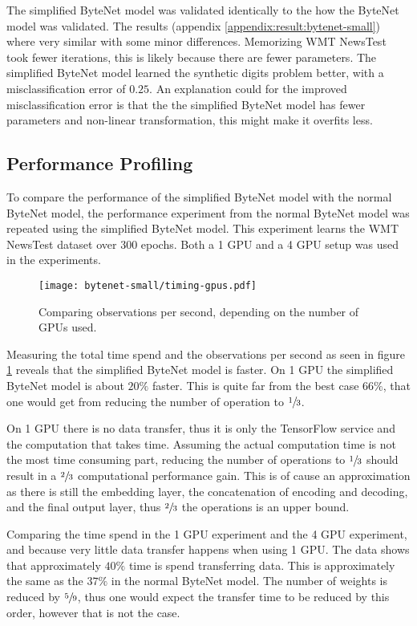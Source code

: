 The simplified ByteNet model was validated identically to the how the ByteNet model was validated. The results (appendix \ref{appendix:result:bytenet-small}) where very similar with some minor differences. Memorizing WMT NewsTest took fewer iterations, this is likely because there are fewer parameters. The simplified ByteNet model learned the synthetic digits problem better, with a misclassification error of $0.25$. An explanation could for the improved misclassification error is that the the simplified ByteNet model has fewer parameters and non-linear transformation, this might make it overfits less.

\subsection{Performance Profiling}

To compare the performance of the simplified ByteNet model with the normal ByteNet model, the performance experiment from the normal ByteNet model was repeated using the simplified ByteNet model. This experiment learns the WMT NewsTest dataset over 300 epochs. Both a 1 GPU and a 4 GPU setup was used in the experiments.

\begin{figure}[h]
    \centering
    \texttt{[image: bytenet-small/timing-gpus.pdf]}
    \caption{Comparing observations per second, depending on the number of GPUs used.}
    \label{fig:result:simple-bytenet:timing-gpus}
\end{figure}

Measuring the total time spend and the observations per second as seen in figure \ref{fig:result:simple-bytenet:timing-gpus} reveals that the simplified ByteNet model is faster. On 1 GPU the simplified ByteNet model is about $20\%$ faster. This is quite far from the best case $66\%$, that one would get from reducing the number of operation to $\sfrac{1}{3}$.

On 1 GPU there is no data transfer, thus it is only the TensorFlow service and the computation that takes time. Assuming the actual computation time is not the most time consuming part, reducing the number of operations to $\sfrac{1}{3}$ should result in a $\sfrac{2}{3}$ computational performance gain. This is of cause an approximation as there is still the embedding layer, the concatenation of encoding and decoding, and the final output layer, thus $\sfrac{2}{3}$ the operations is an upper bound.

Comparing the time spend in the 1 GPU experiment and the 4 GPU experiment, and because very little data transfer happens when using 1 GPU. The data shows that approximately $40\%$ time is spend transferring data. This is approximately the same as the $37\%$ in the normal ByteNet model. The number of weights is reduced by $\sfrac{5}{9}$, thus one would expect the transfer time to be reduced by this order, however that is not the case.

